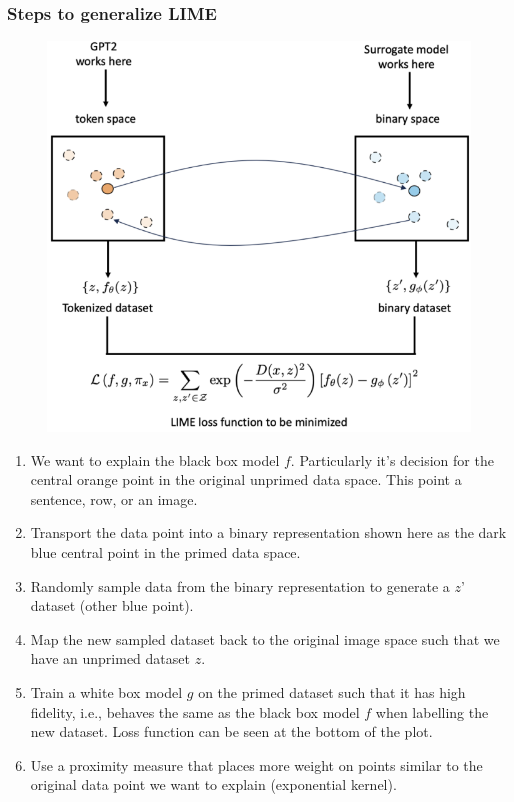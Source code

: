 \subsubsection*{Steps to generalize LIME}
\begin{figure}
    \includegraphics[width = \columnwidth]{figures/XAI3/GeneralizeLIME.png}
\end{figure}
\begin{enumerate}
    \item We want to explain the black box model \(f\). Particularly it's decision for the central orange point in the original unprimed data space. This point a sentence, row, or an image.
    \item Transport the data point into a binary representation shown here as the dark blue central point in the primed data space.
    \item Randomly sample data from the binary representation to generate a \(z\)' dataset (other blue point).
    \item Map the new sampled dataset back to the original image space such that we have an unprimed dataset \(z\).
    \item Train a white box model \(g\) on the primed dataset such that it has high fidelity, i.e., behaves the same as the black box model \(f\) when labelling the new dataset. Loss function can be seen at the bottom of the plot.
    \item Use a proximity measure that places more weight on points similar to the original data point we want to explain (exponential kernel).
\end{enumerate}


